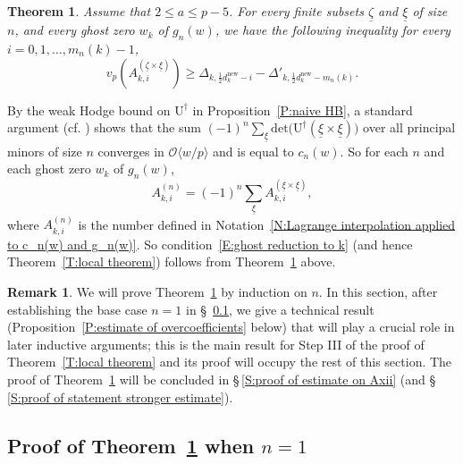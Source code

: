 \documentclass[12pt]{amsart}
\newtheorem{theorem}[subsection]{Theorem}
\theoremstyle{definition}
\newtheorem{remark}[subsection]{Remark}
\numberwithin{equation}{subsection}
\def\calO{\mathcal{O}}
\def\rmU{\mathrm{U}}
\newcommand{\new}{\mathrm{new}}
\renewcommand{\det}{\mathrm{det}}
\begin{document}
\begin{theorem}
\label{T:estimate of nonprincipal minor}
Assume that $2 \leq a \leq p-5$.
For every finite subsets $\underline \zeta$ and  $\underline \xi$ of size $n$, and every ghost zero $w_k$ of $g_n(w)$, we have the following inequality for every $i = 0,1, \dots, m_n(k)-1$,
\begin{equation}
\label{E:ghost reduction to k equivalent version}
v_p(A_{k,i}^{(\underline \zeta \times \underline \xi)}) \geq \Delta_{k,\frac 12 d_{k}^\new -i} - \Delta'_{k, \frac 12 d_{k}^\new - m_n(k)}.
\end{equation}
\end{theorem}

By the weak Hodge bound on $\rmU^\dagger$ in Proposition~\ref{P:naive HB}, a standard argument (cf. \cite[\S~2.10]{liu-truong-xiao-zhao}) shows that the sum $(-1)^n \sum\limits_{\underline \xi}\det \big(\rmU^{\dagger}(\underline \xi \times \underline \xi)\big)$  over all principal minors of size $n$ converges in $\calO\langle w/p\rangle$ and is equal to $c_n(w)$. So for each $n$ and each ghost zero $w_k$ of $g_n(w)$,
$$
A_{k,i}^{(n)} =(-1)^n \sum_{\underline \xi} A_{k, i}^{(\underline \xi\times \underline \xi)},
$$
where $A_{k,i}^{(n)}$ is the number defined in Notation~\ref{N:Lagrange interpolation applied to c_n(w) and g_n(w)}. So condition~\eqref{E:ghost reduction to k} (and hence Theorem~\ref{T:local theorem}) follows from Theorem~\ref{T:estimate of nonprincipal minor} above. 



\begin{remark}\label{remark:organization of the proof of theorem: estimate of nonprincipal minor}
We will prove Theorem~\ref{T:estimate of nonprincipal minor} by induction on $n$. In this section, after establishing the base case $n=1$ in \S~\ref{S:n=1}, we give a technical result (Proposition~\ref{P:estimate of overcoefficients} below) that will play a crucial role in later inductive arguments; this is the main result for Step III of the proof of Theorem~\ref{T:local theorem} and its proof will occupy the rest of this section. The proof of Theorem~\ref{T:estimate of nonprincipal minor} will be concluded in  \S\,\ref{S:proof of estimate on Axii} (and \S\,\ref{S:proof of statement stronger estimate}).
\end{remark}


\subsection{Proof of Theorem~\ref{T:estimate of nonprincipal minor} when $n=1$}
\label{S:n=1}
\end{document}
